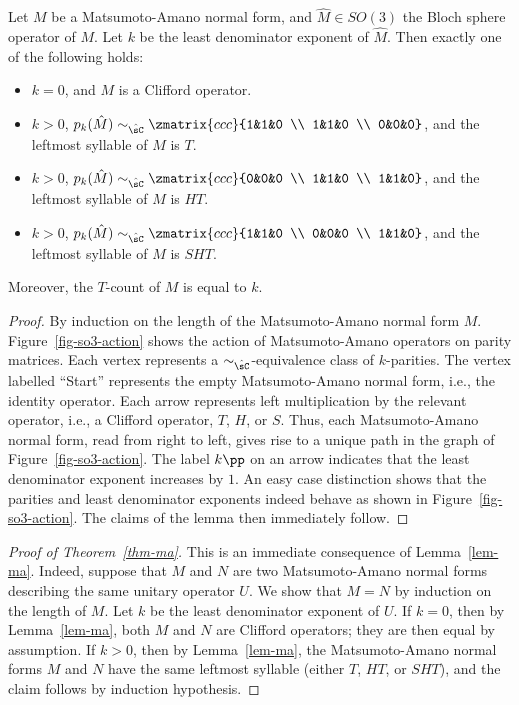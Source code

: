 \documentclass{article}
\begin{document}
\begin{lemma}\label{lem-ma}
  Let $M$ be a Matsumoto-Amano normal form, and $\hat M\in SO(3)$ the Bloch
  sphere operator of $M$.  Let $k$ be the least denominator exponent
  of $\hat M$. Then exactly one of the following holds:\rm
  \begin{itemize}
  \item $k=0$, and $M$ is a Clifford operator.
  \item $k>0$, $p_k(\hat M)\sim_{\hat\sC} \zmatrix{ccc}{1&1&0 \\ 1&1&0 \\
      0&0&0}$, and the leftmost syllable of $M$ is $T$.
  \item $k>0$, $p_k(\hat M)\sim_{\hat\sC} \zmatrix{ccc}{0&0&0 \\ 1&1&0 \\ 1&1&0}$, and the
    leftmost syllable of $M$ is $HT$.
  \item $k>0$, $p_k(\hat M)\sim_{\hat\sC} \zmatrix{ccc}{1&1&0 \\ 0&0&0 \\
      1&1&0}$, and the leftmost syllable of $M$ is $SHT$.
  \end{itemize}
  Moreover, the $T$-count of $M$ is equal to $k$.
\end{lemma}

\begin{proof}
  By induction on the length of the Matsumoto-Amano normal form $M$.
  Figure~\ref{fig-so3-action} shows the action of Matsumoto-Amano
  operators on parity matrices. Each vertex represents a
  $\sim_{\hat\sC}$-equivalence class of $k$-parities. The vertex
  labelled ``Start'' represents the empty Matsumoto-Amano normal form,
  i.e., the identity operator. Each arrow represents left
  multiplication by the relevant operator, i.e., a Clifford operator,
  $T$, $H$, or $S$. Thus, each Matsumoto-Amano normal form, read from
  right to left, gives rise to a unique path in the graph of
  Figure~\ref{fig-so3-action}. The label $k\pp$ on an arrow indicates
  that the least denominator exponent increases by $1$. An easy case
  distinction shows that the parities and least denominator exponents
  indeed behave as shown in Figure~\ref{fig-so3-action}.  The claims
  of the lemma then immediately follow.
\end{proof}

\begin{proof}[Proof of Theorem~\ref{thm-ma}]
  This is an immediate consequence of Lemma~\ref{lem-ma}. Indeed,
  suppose that $M$ and $N$ are two Matsumoto-Amano normal forms
  describing the same unitary operator $U$. We show that $M=N$ by
  induction on the length of $M$. Let $k$ be the least denominator
  exponent of $U$. If $k=0$, then by Lemma~\ref{lem-ma}, both $M$ and
  $N$ are Clifford operators; they are then equal by assumption. If
  $k>0$, then by Lemma~\ref{lem-ma}, the Matsumoto-Amano normal forms
  $M$ and $N$ have the same leftmost syllable (either $T$, $HT$, or
  $SHT$), and the claim follows by induction hypothesis.
\end{proof}
\end{document}
